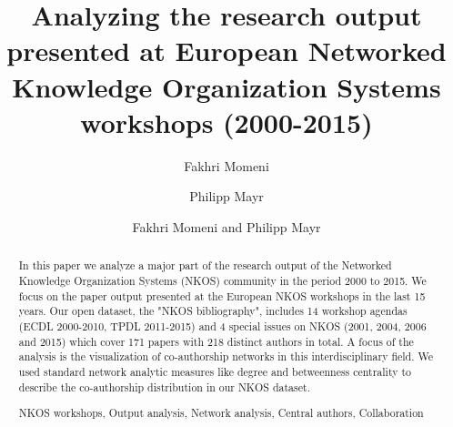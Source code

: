 \documentclass[runningheads,a4paper]{llncs}
\newcommand{\keywords}[1]{\par\addvspace\baselineskip
\noindent\keywordname\enspace\ignorespaces#1}
\begin{document}
\mainmatter  %

\title{Analyzing the research output presented at European Networked Knowledge Organization Systems workshops (2000-2015)}



%
%
\author{Fakhri Momeni%
	\and Philipp Mayr}
%

\author{Fakhri Momeni and Philipp Mayr}

%
%

\maketitle


\begin{abstract}		
In this paper we analyze a major part of the research output of the Networked Knowledge Organization Systems (NKOS) community in the period 2000 to 2015. We focus on the paper output presented at the European NKOS workshops in the last 15 years. Our open dataset, the "NKOS bibliography", includes 14 workshop agendas (ECDL 2000-2010, TPDL 2011-2015) and 4 special issues on NKOS (2001, 2004, 2006 and 2015) which cover 171 papers with 218 distinct authors in total. A focus of the analysis is the visualization of co-authorship networks in this interdisciplinary field. We used standard network analytic measures like degree and betweenness centrality to describe the co-authorship distribution in our NKOS dataset. %


 
\keywords{NKOS workshops, Output analysis, Network analysis, Central authors, Collaboration}
\end{abstract}
\end{document}
